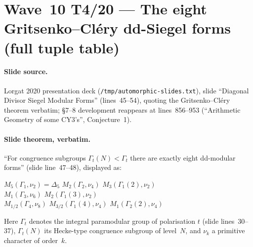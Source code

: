\providecommand{\kBKM}{\kappa_{\mathrm{BKM}}}
\providecommand{\kch}{\kappa_{\mathrm{ch}}}
\providecommand{\kcat}{\kappa_{\mathrm{cat}}}
\providecommand{\ClaimStatusTheorem}{{\bfseries\sffamily[Theorem]}}
\providecommand{\ClaimStatusConjectured}{{\bfseries\sffamily[Conjectured]}}
\providecommand{\Sp}{\mathbf{Sp}}
\providecommand{\GammaT}[2]{\Gamma_{#1}(#2)}

\section*{Wave~10 T4/20 --- The eight Gritsenko--Cl\'ery dd-Siegel forms (full tuple table)}
\label{sec:wave10-t4-8-form-dd-siegel}

\paragraph{Slide source.}
Lorgat 2020 presentation deck (\texttt{/tmp/automorphic-slides.txt}),
slide ``Diagonal Divisor Siegel Modular Forms'' (lines~45--54), quoting
the Gritsenko--Cl\'ery theorem verbatim; §7--8 development reappears at
lines~856--953 (``Arithmetic Geometry of some CY3's'', Conjecture~1).

\paragraph{Slide theorem, verbatim.}
\ClaimStatusTheorem{}
``For congruence subgroups $\Gamma_t(N) < \Gamma_t$ there are exactly
eight dd-modular forms'' (slide line~47--48), displayed as:
\begin{center}
$M_5(\Gamma_1, \nu_2) = \Delta_5$ \quad
$M_2(\Gamma_2, \nu_4)$ \quad
$M_3(\GammaT{1}{2}, \nu_2)$
\\[2pt]
$M_1(\Gamma_3, \nu_6)$ \quad
$M_2(\GammaT{1}{3}, \nu_2)$
\\[2pt]
$M_{1/2}(\Gamma_4, \nu_8)$ \quad
$M_{3/2}(\GammaT{1}{4}, \nu_4)$ \quad
$M_1(\GammaT{2}{2}, \nu_4)$
\end{center}
Here $\Gamma_t$ denotes the integral paramodular group of polarisation
$t$ (slide lines~30--37), $\GammaT{t}{N}$ its Hecke-type congruence
subgroup of level~$N$, and $\nu_k$ a primitive character of order~$k$.

